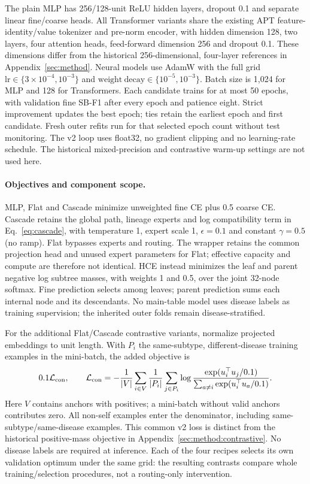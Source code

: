 The plain MLP has 256/128-unit ReLU hidden layers, dropout 0.1 and separate
linear fine/coarse heads. All Transformer variants share the existing APT
feature-identity/value tokenizer and pre-norm encoder, with hidden dimension
128, two layers, four attention heads, feed-forward dimension 256 and dropout
0.1. These dimensions differ from the historical 256-dimensional,
four-layer references in Appendix~\ref{sec:method}.
Neural models use AdamW with the full grid
$\mathrm{lr}\in\{3\times10^{-4},10^{-3}\}$ and
$\mathrm{weight\ decay}\in\{10^{-5},10^{-3}\}$. Batch size is 1{,}024 for
MLP and 128 for Transformers. Each candidate trains for at most 50 epochs,
with validation fine SB-F1 after every epoch and patience eight. Strict
improvement updates the best epoch; ties retain the earliest epoch and first
candidate. Fresh outer refits run for that selected epoch count without test
monitoring. The v2 loop uses float32, no gradient clipping and no learning-rate
schedule. The historical mixed-precision and contrastive warm-up settings
are not used here.

\paragraph{Objectives and component scope.}
MLP, Flat and Cascade minimize unweighted fine CE plus 0.5 coarse CE.
Cascade retains the global path, lineage experts and log compatibility term
in Eq.~\ref{eq:cascade}, with temperature 1, expert scale 1, $\epsilon=0.1$
and constant $\gamma=0.5$ (no ramp). Flat bypasses experts and routing.
The wrapper retains the common projection head and unused expert parameters
for Flat; effective capacity and compute are therefore not identical.
HCE instead minimizes the leaf and parent negative log subtree masses, with
weights 1 and 0.5, over the joint 32-node softmax. Fine prediction selects
among leaves; parent prediction sums each internal node and its descendants.
No main-table model uses disease labels as training supervision; the inherited
outer folds remain disease-stratified.

For the additional Flat/Cascade contrastive variants, normalize projected
embeddings to unit length. With $P_i$ the same-subtype, different-disease
training examples in the mini-batch, the added objective is
\begin{equation}
0.1\mathcal L_{\rm con},\qquad
\mathcal L_{\rm con}=-\frac{1}{|V|}\sum_{i\in V}\frac{1}{|P_i|}
\sum_{j\in P_i}\log\frac{\exp(u_i^\top u_j/0.1)}
{\sum_{a\ne i}\exp(u_i^\top u_a/0.1)}.
\end{equation}
Here $V$ contains anchors with positives; a mini-batch without valid anchors
contributes zero. All non-self examples enter the denominator, including
same-subtype/same-disease examples. This common v2 loss is distinct from the
historical positive-mass objective in Appendix~\ref{sec:method:contrastive}.
No disease labels are required at inference. Each of the four recipes selects
its own validation optimum under the same grid: the resulting contrasts
compare whole training/selection procedures, not a routing-only intervention.

